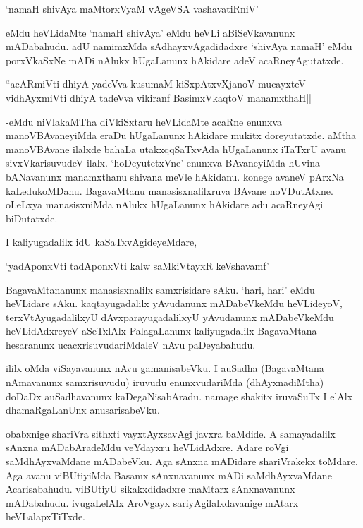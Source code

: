 \begin{shloka}
`namaH shivAya maMtorxV\s yaM vAgeVSA vashavatiRniV'
\end{shloka}

eMdu heVLidaMte `namaH shivAya' eMdu heVLi aBiSeVkavanunx mADabahudu. adU namimxMda sAdhayxvAgadidadxre `shivAya namaH' eMdu porxVkaSxNe mADi nAlukx hUgaLanunx hAkidare adeV acaRneyAgutatxde.

\begin{shloka}
``acARmiVti dhiyA yadeVva kusumaM kiSxpAtxvXjanoV mucayxteV|\\
vidhAyxmiVti dhiyA tadeVva vikiranf BasimxVkaqtoV manamxthaH||
\end{shloka}

-eMdu niVlakaMTha diVkiSxtaru heVLidaMte acaRne enunxva manoVBAvaneyiMda eraDu hUgaLanunx hAkidare mukitx doreyutatxde. aMtha manoVBAvane ilalxde bahaLa utakxqqSaTxvAda hUgaLanunx iTaTxrU avanu sivxVkarisuvudeV ilalx. `hoDeyutetxVne' enunxva BAvaneyiMda hUvina bANavanunx manamxthanu shivana meVle hAkidanu. konege avaneV pArxNa kaLedukoMDanu. BagavaMtanu manasisxnalilxruva BAvane noVDutAtxne. oLeLxya manasisxniMda nAlukx hUgaLanunx hAkidare adu acaRneyAgi biDutatxde.

I kaliyugadalilx idU kaSaTxvAgideyeMdare,

\begin{shloka}
`yadAponxVti tadAponxVti kalw saMkiVtayxR keVshavamf'
\end{shloka}

BagavaMtananunx manasisxnalilx samxrisidare sAku. `hari, hari' eMdu heVLidare sAku. kaqtayugadalilx yAvudanunx mADabeVkeMdu heVLideyoV, terxVtAyugadalilxyU dAvxparayugadalilxyU yAvudanunx mADabeVkeMdu heVLidAdxreyeV aSeTxlAlx PalagaLanunx kaliyugadalilx BagavaMtana hesaranunx ucacxrisuvudariMdaleV nAvu paDeyabahudu.

ililx oMda viSayavanunx nAvu gamanisabeVku. I auSadha (BagavaMtana nAmavanunx samxrisuvudu) iruvudu enunxvudariMda (dhAyxnadiMtha) doDaDx auSadhavanunx kaDegaNisabAradu. namage shakitx iruvaSuTx I elAlx dhamaRgaLanUnx anusarisabeVku.

obabxnige shariVra sithxti vayxtAyxsavAgi javxra baMdide. A samayadalilx sAnxna mADabAradeMdu veYdayxru heVLidAdxre. Adare roVgi saMdhAyxvaMdane mADabeVku. Aga sAnxna mADidare shariVrakekx toMdare. Aga avanu viBUtiyiMda Basamx sAnxnavanunx mADi saMdhAyxvaMdane Acarisabahudu. viBUtiyU sikakxdidadxre maMtarx sAnxnavanunx mADabahudu. ivugaLelAlx AroVgayx sariyAgilalxdavanige mAtarx heVLalapxTiTxde.


